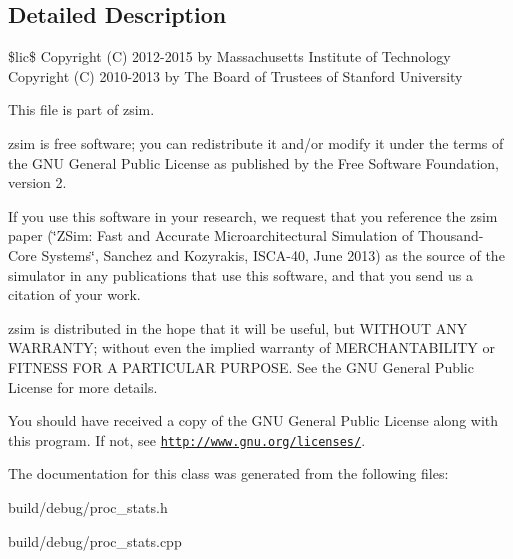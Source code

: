 \subsection{Detailed Description}
\$lic\$ Copyright (C) 2012-\/2015 by Massachusetts Institute of Technology Copyright (C) 2010-\/2013 by The Board of Trustees of Stanford University

This file is part of zsim.

zsim is free software; you can redistribute it and/or modify it under the terms of the G\-N\-U General Public License as published by the Free Software Foundation, version 2.

If you use this software in your research, we request that you reference the zsim paper (\char`\"{}\-Z\-Sim\-: Fast and Accurate Microarchitectural Simulation of
\-Thousand-\/\-Core Systems\char`\"{}, Sanchez and Kozyrakis, I\-S\-C\-A-\/40, June 2013) as the source of the simulator in any publications that use this software, and that you send us a citation of your work.

zsim is distributed in the hope that it will be useful, but W\-I\-T\-H\-O\-U\-T A\-N\-Y W\-A\-R\-R\-A\-N\-T\-Y; without even the implied warranty of M\-E\-R\-C\-H\-A\-N\-T\-A\-B\-I\-L\-I\-T\-Y or F\-I\-T\-N\-E\-S\-S F\-O\-R A P\-A\-R\-T\-I\-C\-U\-L\-A\-R P\-U\-R\-P\-O\-S\-E. See the G\-N\-U General Public License for more details.

You should have received a copy of the G\-N\-U General Public License along with this program. If not, see \href{http://www.gnu.org/licenses/}{\tt http\-://www.\-gnu.\-org/licenses/}. 

The documentation for this class was generated from the following files\-:\begin{DoxyCompactItemize}
\item 
build/debug/proc\-\_\-stats.\-h\item 
build/debug/proc\-\_\-stats.\-cpp\end{DoxyCompactItemize}

